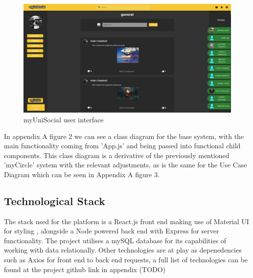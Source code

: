 \documentclass[lettersize,journal]{IEEEtran}
\begin{document}
	 \begin{figure}[h!]
                \includegraphics[width=\linewidth]{images/myunisocial.PNG}
                \caption{myUniSocial user interface}
                \label{figure 2}
        \end{figure}


        In appendix A figure 2 we can see a class diagram for the base system, with the main functionality coming from 'App.js' and being passed into
        functional child components. This class diagram is a derivative of the previously mentioned 'myCircle' system with the relevant adjustments,
        as is the same for the Use Case Diagram which can be seen in Appendix A figure 3.

        \subsection{Technological Stack}
        The stack used for the platform is a React.js front end \cite{React} making use of Material UI for styling \cite{Mui}, alongside a Node powered back end \cite{Node} with Express for server
    functionality\cite{Express}. The project utilises a mySQL database for its capabilities of working with data relationally. Other technologies are at play as depenedencies such as Axios for front end to
     back end requests, a full list of technologies can be found at the project github link in appendix (TODO)
\end{document}
